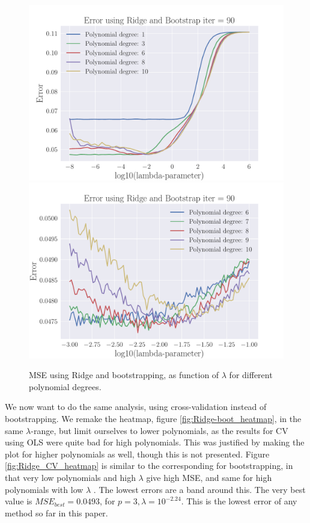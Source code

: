 \documentclass[reprint,english,notitlepage,aps,nobalancelastpage,nofootinbib]{revtex4-1}  %
\begin{document}
\begin{figure}[H]
	\includegraphics[width=\linewidth]{lambdaMSE_Ridge_Bootstrap90_n30_eps02_p10_lm8_6.pdf}
	\endminipage\hfill
	\includegraphics[width=\linewidth]{lambdaMSE_Ridge_Bootstrap90_n30_eps02_p10_lm3_m1.pdf}
	\endminipage
	\caption{MSE using Ridge and bootstrapping, as function of $\lambda$ for different polynomial degrees.}
	\label{fig:Ridge-boot_lambdas}
\end{figure}


We now want to do the same analysis, using cross-validation instead of bootstrapping. We remake the heatmap, figure \ref{fig:Ridge-boot_heatmap}, in the same $\lambda$-range, but limit ourselves to lower polynomials, as the results for CV using OLS were quite bad for high polynomials. This was justified by making the plot for higher polynomials as well, though this is not presented. Figure \ref{fig:Ridge_CV_heatmap} is similar to the corresponding for bootstrapping, in that very low polynomials and high $\lambda$ give high MSE, and same for high polynomials with low $\lambda$ . The lowest errors are a band around this. The very best value is $MSE_{best}=0.0493$, for $p=3, \lambda=10^{-2.24}$. This is the lowest error of any method so far in this paper.
\end{document}
